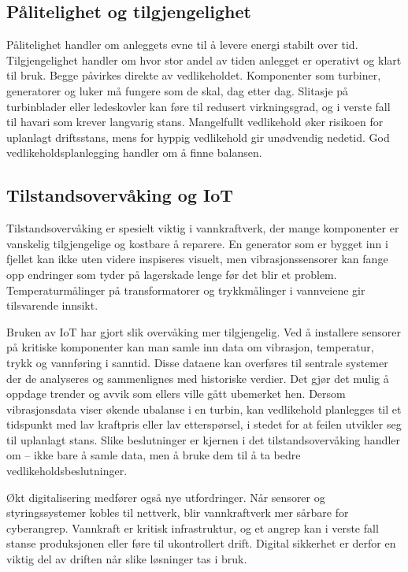 \subsection*{Pålitelighet og tilgjengelighet}
Pålitelighet handler om anleggets evne til å levere energi stabilt over tid. Tilgjengelighet handler om hvor stor andel av tiden anlegget er operativt og klart til bruk. Begge påvirkes direkte av vedlikeholdet. Komponenter som turbiner, generatorer og luker må fungere som de skal, dag etter dag. Slitasje på turbinblader eller ledeskovler kan føre til redusert virkningsgrad, og i verste fall til havari som krever langvarig stans. Mangelfullt vedlikehold øker risikoen for uplanlagt driftsstans, mens for hyppig vedlikehold gir unødvendig nedetid. God vedlikeholdsplanlegging handler om å finne balansen.

\subsection*{Tilstandsovervåking og IoT}
Tilstandsovervåking er spesielt viktig i vannkraftverk, der mange komponenter er vanskelig tilgjengelige og kostbare å reparere. En generator som er bygget inn i fjellet kan ikke uten videre inspiseres visuelt, men vibrasjonssensorer kan fange opp endringer som tyder på lagerskade lenge før det blir et problem. Temperaturmålinger på transformatorer og trykkmålinger i vannveiene gir tilsvarende innsikt.

Bruken av IoT har gjort slik overvåking mer tilgjengelig. Ved å installere sensorer på kritiske komponenter kan man samle inn data om vibrasjon, temperatur, trykk og vannføring i sanntid. Disse dataene kan overføres til sentrale systemer der de analyseres og sammenlignes med historiske verdier. Det gjør det mulig å oppdage trender og avvik som ellers ville gått ubemerket hen. Dersom vibrasjonsdata viser økende ubalanse i en turbin, kan vedlikehold planlegges til et tidspunkt med lav kraftpris eller lav etterspørsel, i stedet for at feilen utvikler seg til uplanlagt stans. Slike beslutninger er kjernen i det tilstandsovervåking handler om -- ikke bare å samle data, men å bruke dem til å ta bedre vedlikeholdsbeslutninger.

Økt digitalisering medfører også nye utfordringer. Når sensorer og styringssystemer kobles til nettverk, blir vannkraftverk mer sårbare for cyberangrep. Vannkraft er kritisk infrastruktur, og et angrep kan i verste fall stanse produksjonen eller føre til ukontrollert drift. Digital sikkerhet er derfor en viktig del av driften når slike løsninger tas i bruk.

